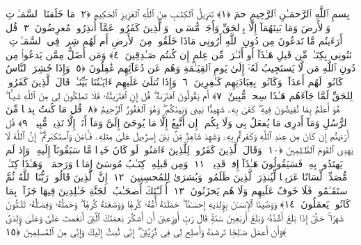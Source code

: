 
  
    
  
    
    

\nopagebreak
  بِسمِ ٱللَّهِ ٱلرَّحمَـٰنِ ٱلرَّحِيمِ
  حمٓ ﴿١﴾
 تَنزِيلُ ٱلكِتَـٰبِ مِنَ ٱللَّهِ ٱلعَزِيزِ ٱلحَكِيمِ ﴿٢﴾
 مَا خَلَقنَا ٱلسَّمَـٰوَٟتِ وَٱلأَرضَ وَمَا بَينَهُمَآ إِلَّا بِٱلحَقِّ وَأَجَلٍۢ مُّسَمًّۭى ۚ وَٱلَّذِينَ كَفَرُوا۟ عَمَّآ أُنذِرُوا۟ مُعرِضُونَ ﴿٣﴾
 قُل أَرَءَيتُم مَّا تَدعُونَ مِن دُونِ ٱللَّهِ أَرُونِى مَاذَا خَلَقُوا۟ مِنَ ٱلأَرضِ أَم لَهُم شِركٌۭ فِى ٱلسَّمَـٰوَٟتِ ۖ ٱئتُونِى بِكِتَـٰبٍۢ مِّن قَبلِ هَـٰذَآ أَو أَثَـٰرَةٍۢ مِّن عِلمٍ إِن كُنتُم صَـٰدِقِينَ ﴿٤﴾
 وَمَن أَضَلُّ مِمَّن يَدعُوا۟ مِن دُونِ ٱللَّهِ مَن لَّا يَستَجِيبُ لَهُۥٓ إِلَىٰ يَومِ ٱلقِيَـٰمَةِ وَهُم عَن دُعَآئِهِم غَٰفِلُونَ ﴿٥﴾
 وَإِذَا حُشِرَ ٱلنَّاسُ كَانُوا۟ لَهُم أَعدَآءًۭ وَكَانُوا۟ بِعِبَادَتِهِم كَـٰفِرِينَ ﴿٦﴾
 وَإِذَا تُتلَىٰ عَلَيهِم ءَايَـٰتُنَا بَيِّنَـٰتٍۢ قَالَ ٱلَّذِينَ كَفَرُوا۟ لِلحَقِّ لَمَّا جَآءَهُم هَـٰذَا سِحرٌۭ مُّبِينٌ ﴿٧﴾
 أَم يَقُولُونَ ٱفتَرَىٰهُ ۖ قُل إِنِ ٱفتَرَيتُهُۥ فَلَا تَملِكُونَ لِى مِنَ ٱللَّهِ شَيـًٔا ۖ هُوَ أَعلَمُ بِمَا تُفِيضُونَ فِيهِ ۖ كَفَىٰ بِهِۦ شَهِيدًۢا بَينِى وَبَينَكُم ۖ وَهُوَ ٱلغَفُورُ ٱلرَّحِيمُ ﴿٨﴾
 قُل مَا كُنتُ بِدعًۭا مِّنَ ٱلرُّسُلِ وَمَآ أَدرِى مَا يُفعَلُ بِى وَلَا بِكُم ۖ إِن أَتَّبِعُ إِلَّا مَا يُوحَىٰٓ إِلَىَّ وَمَآ أَنَا۠ إِلَّا نَذِيرٌۭ مُّبِينٌۭ ﴿٩﴾
 قُل أَرَءَيتُم إِن كَانَ مِن عِندِ ٱللَّهِ وَكَفَرتُم بِهِۦ وَشَهِدَ شَاهِدٌۭ مِّنۢ بَنِىٓ إِسرَٰٓءِيلَ عَلَىٰ مِثلِهِۦ فَـَٔامَنَ وَٱستَكبَرتُم ۖ إِنَّ ٱللَّهَ لَا يَهدِى ٱلقَومَ ٱلظَّـٰلِمِينَ ﴿١٠﴾
 وَقَالَ ٱلَّذِينَ كَفَرُوا۟ لِلَّذِينَ ءَامَنُوا۟ لَو كَانَ خَيرًۭا مَّا سَبَقُونَآ إِلَيهِ ۚ وَإِذ لَم يَهتَدُوا۟ بِهِۦ فَسَيَقُولُونَ هَـٰذَآ إِفكٌۭ قَدِيمٌۭ ﴿١١﴾
 وَمِن قَبلِهِۦ كِتَـٰبُ مُوسَىٰٓ إِمَامًۭا وَرَحمَةًۭ ۚ وَهَـٰذَا كِتَـٰبٌۭ مُّصَدِّقٌۭ لِّسَانًا عَرَبِيًّۭا لِّيُنذِرَ ٱلَّذِينَ ظَلَمُوا۟ وَبُشرَىٰ لِلمُحسِنِينَ ﴿١٢﴾
 إِنَّ ٱلَّذِينَ قَالُوا۟ رَبُّنَا ٱللَّهُ ثُمَّ ٱستَقَـٰمُوا۟ فَلَا خَوفٌ عَلَيهِم وَلَا هُم يَحزَنُونَ ﴿١٣﴾
 أُو۟لَـٰٓئِكَ أَصحَـٰبُ ٱلجَنَّةِ خَـٰلِدِينَ فِيهَا جَزَآءًۢ بِمَا كَانُوا۟ يَعمَلُونَ ﴿١٤﴾
 وَوَصَّينَا ٱلإِنسَـٰنَ بِوَٟلِدَيهِ إِحسَـٰنًا ۖ حَمَلَتهُ أُمُّهُۥ كُرهًۭا وَوَضَعَتهُ كُرهًۭا ۖ وَحَملُهُۥ وَفِصَـٰلُهُۥ ثَلَـٰثُونَ شَهرًا ۚ حَتَّىٰٓ إِذَا بَلَغَ أَشُدَّهُۥ وَبَلَغَ أَربَعِينَ سَنَةًۭ قَالَ رَبِّ أَوزِعنِىٓ أَن أَشكُرَ نِعمَتَكَ ٱلَّتِىٓ أَنعَمتَ عَلَىَّ وَعَلَىٰ وَٟلِدَىَّ وَأَن أَعمَلَ صَـٰلِحًۭا تَرضَىٰهُ وَأَصلِح لِى فِى ذُرِّيَّتِىٓ ۖ إِنِّى تُبتُ إِلَيكَ وَإِنِّى مِنَ ٱلمُسلِمِينَ ﴿١٥﴾
